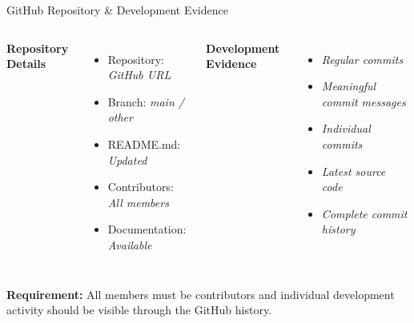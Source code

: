 \documentclass[aspectratio=169,11pt]{beamer}
\newcommand{\placeholder}[1]{%
\textit{\color{GEUGrey}#1}
}
\begin{document}
\begin{frame}{GitHub Repository \& Development Evidence}

\begin{columns}[T,totalwidth=\textwidth]


\textbf{\color{GEUBlue}Repository Details}

\begin{itemize}\itemsep3pt
    \item Repository: \placeholder{GitHub URL}
    \item Branch: \placeholder{main / other}
    \item README.md: \placeholder{Updated}
    \item Contributors: \placeholder{All members}
    \item Documentation: \placeholder{Available}
\end{itemize}


\textbf{\color{GEUBlue}Development Evidence}

\begin{itemize}\itemsep3pt
    \item \placeholder{Regular commits}
    \item \placeholder{Meaningful commit messages}
    \item \placeholder{Individual commits}
    \item \placeholder{Latest source code}
    \item \placeholder{Complete commit history}
\end{itemize}

\end{columns}

\vfill

\begin{center}
\colorbox{GEULightBlue}{
\parbox{.88\textwidth}{
\centering
\textbf{Requirement:}
All members must be contributors and individual development
activity should be visible through the GitHub history.
}}
\end{center}

\end{frame}
\end{document}
